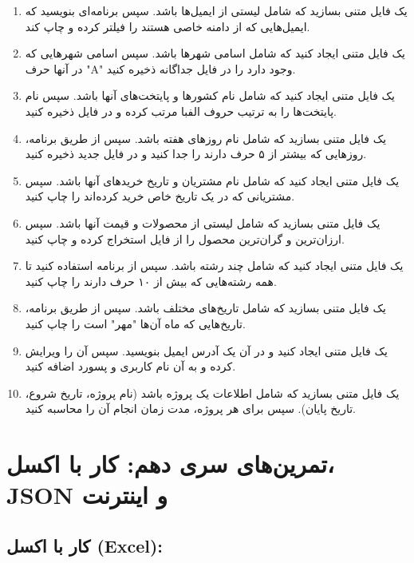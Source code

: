 \documentclass[a4paper,12pt]{article}
\begin{document}
	\begin{enumerate}
		\item یک فایل متنی بسازید که شامل لیستی از ایمیل‌ها باشد. سپس برنامه‌ای بنویسید که ایمیل‌هایی که از دامنه خاصی هستند را فیلتر کرده و چاپ کند.
		\item یک فایل متنی ایجاد کنید که شامل اسامی شهرها باشد. سپس اسامی شهرهایی که در آنها حرف "A" وجود دارد را در فایل جداگانه ذخیره کنید.
		\item یک فایل متنی ایجاد کنید که شامل نام کشورها و پایتخت‌های آنها باشد. سپس نام پایتخت‌ها را به ترتیب حروف الفبا مرتب کرده و در فایل ذخیره کنید.
		\item یک فایل متنی بسازید که شامل نام روزهای هفته باشد. سپس از طریق برنامه، روزهایی که بیشتر از ۵ حرف دارند را جدا کنید و در فایل جدید ذخیره کنید.
		\item یک فایل متنی ایجاد کنید که شامل نام مشتریان و تاریخ خریدهای آنها باشد. سپس مشتریانی که در یک تاریخ خاص خرید کرده‌اند را چاپ کنید.
		\item یک فایل متنی بسازید که شامل لیستی از محصولات و قیمت آنها باشد. سپس ارزان‌ترین و گران‌ترین محصول را از فایل استخراج کرده و چاپ کنید.
		\item یک فایل متنی ایجاد کنید که شامل چند رشته باشد. سپس از برنامه استفاده کنید تا همه رشته‌هایی که بیش از ۱۰ حرف دارند را چاپ کنید.
		\item یک فایل متنی بسازید که شامل تاریخ‌های مختلف باشد. سپس از طریق برنامه، تاریخ‌هایی که ماه آن‌ها "مهر" است را چاپ کنید.
		\item یک فایل متنی ایجاد کنید و در آن یک آدرس ایمیل بنویسید. سپس آن را ویرایش کرده و به آن نام کاربری و پسورد اضافه کنید.
		\item یک فایل متنی بسازید که شامل اطلاعات یک پروژه باشد (نام پروژه، تاریخ شروع، تاریخ پایان). سپس برای هر پروژه، مدت زمان انجام آن را محاسبه کنید.
	\end{enumerate}
	
	
	
	
	
	\newpage
	\section*{تمرین‌های سری دهم: کار با اکسل، JSON و اینترنت}
	
	\subsection*{کار با اکسل (Excel):}
	
\end{document}
